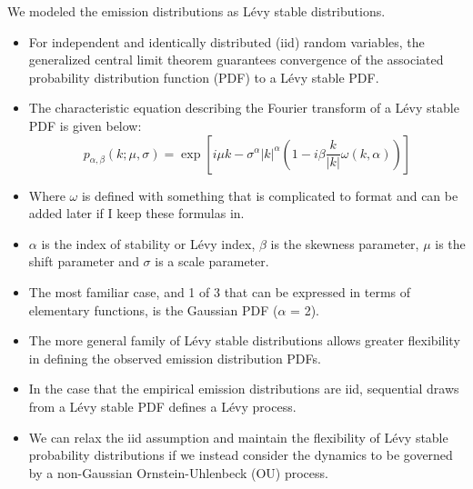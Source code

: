 \documentclass{article}
\begin{document}
  \noindent We modeled the emission distributions as L\'evy stable distributions.  %
  \begin{itemize}
    \item For independent and identically distributed (iid) random variables, the 
    generalized central limit theorem guarantees convergence of the associated 
    probability distribution function (PDF) to a L\'evy stable PDF. \cite{klages_anomalous_2008}
    \item The characteristic equation describing the Fourier transform of a L\'evy 
    stable PDF is given below:
    \begin{equation}
    p_{\alpha, \beta}(k;\mu,\sigma) =\exp\left[i\mu k - \sigma^{\alpha}|k|^{\alpha}\left(1 - i\beta\frac{k}{|k|}\omega(k, \alpha)\right)\right]
    \end{equation}
    \item Where $\omega$ is defined with something that is complicated to format and can be 
    added later if I keep these formulas in. %
    \item $\alpha$ is the index of stability or L\'evy index, $\beta$ is the skewness 
    parameter, $\mu$ is the shift parameter and $\sigma$ is a scale parameter.
    \item The most familiar case, and 1 of 3 that can be expressed in terms of elementary
    functions, is the Gaussian PDF ($\alpha$ = 2).
    \item The more general family of L\'evy stable distributions allows
    greater flexibility in defining the observed emission distribution PDFs.
    \item In the case that the empirical emission distributions are iid, sequential draws
    from a L\'evy stable PDF defines a L\'evy process. 
    \item We can relax the iid assumption and maintain the flexibility of L\'evy stable 
    probability distributions if we instead consider the dynamics to be governed by a
    non-Gaussian Ornstein-Uhlenbeck (OU) process.\cite{barndorffnielsen_non-gaussian_2001} %

\end{itemize}
\end{document}
